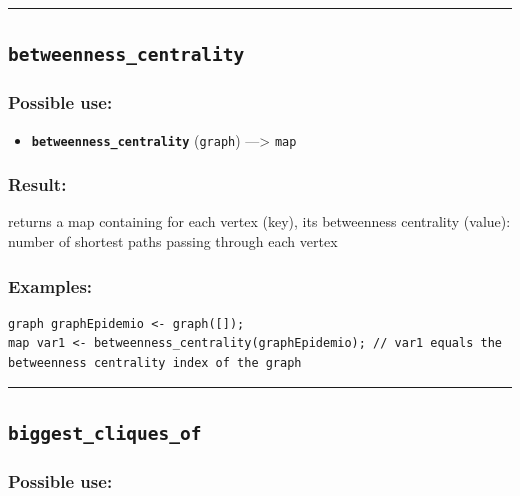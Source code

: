 \documentclass[]{book}
\providecommand{\tightlist}{%
  \setlength{\itemsep}{0pt}\setlength{\parskip}{0pt}}
\theoremstyle{definition}
\theoremstyle{definition}
\theoremstyle{definition}
\theoremstyle{remark}
\begin{document}
\begin{center}\rule{0.5\linewidth}{\linethickness}\end{center}

\subsection{\texorpdfstring{\texttt{betweenness\_centrality}}{betweenness\_centrality}}\label{betweenness_centrality}

\subsubsection{Possible use:}\label{possible-use-68}

\begin{itemize}
\tightlist
\item
  \textbf{\texttt{betweenness\_centrality}} (\texttt{graph})
  ---\textgreater{} \texttt{map}
\end{itemize}

\subsubsection{Result:}\label{result-67}

returns a map containing for each vertex (key), its betweenness
centrality (value): number of shortest paths passing through each vertex

\subsubsection{Examples:}\label{examples-54}

\begin{verbatim}
graph graphEpidemio <- graph([]);  
map var1 <- betweenness_centrality(graphEpidemio); // var1 equals the betweenness centrality index of the graph
\end{verbatim}

\begin{center}\rule{0.5\linewidth}{\linethickness}\end{center}

\subsection{\texorpdfstring{\texttt{biggest\_cliques\_of}}{biggest\_cliques\_of}}\label{biggest_cliques_of}

\subsubsection{Possible use:}\label{possible-use-69}
\end{document}
